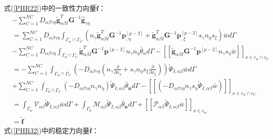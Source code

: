 \par
式(\ref{PHR22})中的一致性力向量$\tilde{\pmb{f}}$：
\begin{equation}
\begin{split}
    &-\sum_{C=1}^{N\!C}D_{\alpha\beta\gamma\eta}\tilde{\pmb g}^T_{\alpha\beta I}\pmb G^{-1}\hat{\pmb g}_{\gamma\eta}\\
    &=\sum_{C=1}^{N\!C}D_{\alpha\beta\gamma\eta}\int_{{\Gamma_w}\cap{\Gamma_C}}(n_{\gamma}
    \tilde{\pmb g}_{\alpha\beta I}^T\pmb G^{-1}\pmb{p}^{[p-2]}_{,\eta}+\tilde{\pmb g}_{\alpha\beta I}^T
    \pmb G^{-1}\pmb{p}^{[p-2]}_{,\xi}s_{\gamma}n_{\eta}s_{\xi})\bar{w}d\Gamma\\
    &-\sum_{C=1}^{N\!C}D_{\alpha\beta\gamma\eta}\int_{{\Gamma_{\theta}}\cap{\Gamma_{C}}}\tilde{\pmb g}^T_{\alpha\beta I}\pmb G^{-1}\pmb{p}^{[p-2]}n_{\gamma}n_{\eta}\bar{\theta}_nd\Gamma-[[\tilde{\pmb g}_{\alpha\beta I}\pmb G^{-1}\pmb{p}^{[p-2]}n_{\gamma}s_{\eta}\bar{w}]]_{x\in{c_w}\cap{c_C}}\\
    &=-\sum_{C=1}^{N\!C}\int_{{\Gamma_w}\cap{\Gamma_C}}(-D_{\alpha\beta\gamma\eta}(n_{\gamma}\frac{\partial}{\partial x_{\eta}}+s_{\gamma}n_{\eta}s_{\xi}\frac{\partial}{\partial x_{\xi}}))\tilde{\Psi}_{I,\alpha\beta}\bar{w}d\Gamma\\
    &+\sum_{C=1}^{N\!C}\int_{{\Gamma_{\theta}}\cap{\Gamma_C}}(-D_{\alpha\beta\gamma\eta}n_{\gamma}n_{\eta})\tilde{\Psi}_{I,\alpha\beta}\bar{\theta}_{\pmb n}d\Gamma-[[(-D_{\alpha\beta\gamma\eta}n_{\gamma}s_{\eta}\tilde{\Psi}_{I,\alpha\beta}\bar{w})]]_{x\in{c_w}\cap{c_C}}\\
    &=\int_{\Gamma_w}\mathcal{V}_{\alpha\beta}\tilde{\Psi}_{I,\alpha\beta}\bar{w}d\Gamma+\int_{\Gamma_{\theta}}\mathcal{M}_{\alpha\beta}\tilde{\Psi}_{I,\alpha\beta}\bar{\theta}_{\pmb n}d\Gamma+[[\mathcal{P}_{\alpha\beta}\tilde{\Psi}_{I,\alpha\beta}\bar{w}]]_{x\in{c_w}}\\
    &=\tilde{\pmb f}
\end{split}
\end{equation}
\newpage
式(\ref{PHR32})中的稳定力向量$\bar{\pmb{f}}$：
